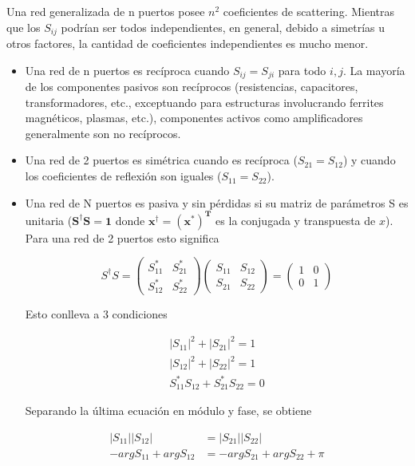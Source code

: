 Una red generalizada de n puertos posee $n^2$ coeficientes de scattering. Mientras que los $S_{ij}$ podrían ser todos independientes,
en general, debido a simetrías u otros factores, la cantidad de coeficientes independientes es mucho menor.
\begin{itemize}
	\item Una red de n puertos es recíproca cuando $S_{ij} = S_{ji}$ para todo $i, j$. La mayoría de los componentes pasivos son
		recíprocos (resistencias, capacitores, transformadores, etc., exceptuando para estructuras involucrando ferrites magnéticos,
		plasmas, etc.), componentes activos como amplificadores generalmente son no recíprocos.
	\item Una red de 2 puertos es simétrica cuando es recíproca ($S_{21} = S_{12}$) y cuando los coeficientes de reflexión son iguales
		($S_{11} = S_{22}$).
	\item Una red de N puertos es pasiva y sin pérdidas si su matriz de parámetros S es unitaria ($\mathbf{S^{\dagger}S = 1}$ donde
		$\mathbf{x^{\dagger} = (x^*)^T}$ es la conjugada y transpuesta de $x$). Para una red de 2 puertos esto significa

\begin{equation}
S^{\dagger}S = \begin{pmatrix} S_{11}^* & S_{21}^*\\S_{12}^* & S_{22}^* \end{pmatrix}
			\begin{pmatrix} S_{11} & S_{12}\\S_{21} & S_{22} \end{pmatrix} = \begin{pmatrix} 1 & 0\\0 & 1 \end{pmatrix}
\end{equation}

Esto conlleva a 3 condiciones

\begin{equation}
\begin{aligned}
	|S_{11}|^2 + |S_{21}|^2 = 1 \\
	|S_{12}|^2 + |S_{22}|^2 = 1 \\
	S_{11}^*S_{12} + S_{21}^*S_{22} = 0
\end{aligned}
\label{eq:sCondition}
\end{equation}

Separando la última ecuación en módulo y fase, se obtiene

\begin{equation}
\begin{aligned}
	|S_{11}||S_{12}| &= |S_{21}||S_{22}| \\
	-argS_{11} + argS_{12} &= -argS_{21} + argS_{22} + \pi
\end{aligned}
\label{eq:con}
\end{equation}


\end{itemize}
